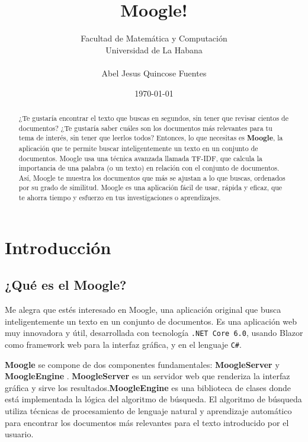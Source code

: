 \documentclass[a4paper, 12pt]{report}
\begin{document}
\title{{\bf \LARGE Moogle!}}
\author{Facultad de Matemática y Computación \\ Universidad de La Habana \\ \\ Abel Jesus Quincose Fuentes}
\date{\today}

\maketitle

\begin{abstract}
	¿Te gustaría encontrar el texto que buscas en segundos, sin tener que revisar cientos de documentos? ¿Te gustaría saber cuáles son los documentos más relevantes para tu tema de interés, sin tener que leerlos todos? Entonces, lo que necesitas es {\bf Moogle}, la aplicación que te permite buscar inteligentemente un texto en un conjunto de documentos. Moogle usa una técnica avanzada llamada TF-IDF, que calcula la importancia de una palabra (o un texto) en relación con el conjunto de documentos. Así, Moogle te muestra los documentos que más se ajustan a lo que buscas, ordenados por su grado de similitud. Moogle es una aplicación fácil de usar, rápida y eficaz, que te ahorra tiempo y esfuerzo en tus investigaciones o aprendizajes.
\end{abstract}

\tableofcontents

\newpage

\section*{Introducción}

\subsection*{¿Qué es el  Moogle?}

Me alegra que estés interesado en Moogle, una aplicación  original que busca inteligentemente un texto en un conjunto de documentos.
 Es una aplicación web muy innovadora y útil, desarrollada con tecnología {\tt .NET Core 6.0}, usando Blazor como framework web para la interfaz gráfica, y en el lenguaje {\tt C\#}.

{ \bf Moogle} se compone de dos componentes fundamentales: {\bf MoogleServer} y {\bf  MoogleEngine}
. {\bf  MoogleServer} es un servidor web que renderiza la interfaz gráfica y sirve los resultados.{\bf MoogleEngine} es una biblioteca de clases donde está implementada la lógica del algoritmo de búsqueda.
 El algoritmo de búsqueda utiliza técnicas de procesamiento de lenguaje natural y aprendizaje
 automático para encontrar los documentos más relevantes para el texto introducido por el usuario.
\end{document}
